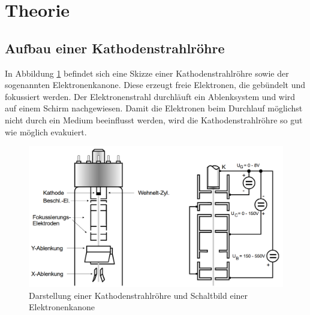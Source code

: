 \section{Theorie}
\label{sec:Theorie}
\subsection{Aufbau einer Kathodenstrahlröhre}
\label{subsec:Kathodenstrahlröhre}

In Abbildung \ref{fig:kathode} befindet sich eine Skizze einer Kathodenstrahlröhre sowie der
sogenannten Elektronenkanone. Diese erzeugt freie Elektronen, die gebündelt und
fokussiert werden. Der Elektronenstrahl durchläuft ein Ablenksystem und wird auf einem
Schirm nachgewiesen. Damit die Elektronen beim Durchlauf möglichst nicht durch
ein Medium beeinflusst werden, wird die Kathodenstrahlröhre so gut wie möglich evakuiert.

\begin{figure}[H]
  \centering
  \includegraphics[width=400pt]{data/kathodenstrahlroehre.png}
  \caption{Darstellung einer Kathodenstrahlröhre und Schaltbild einer Elektronenkanone\cite{Versuchsanleitung501}}
  \label{fig:kathode}
\end{figure}

